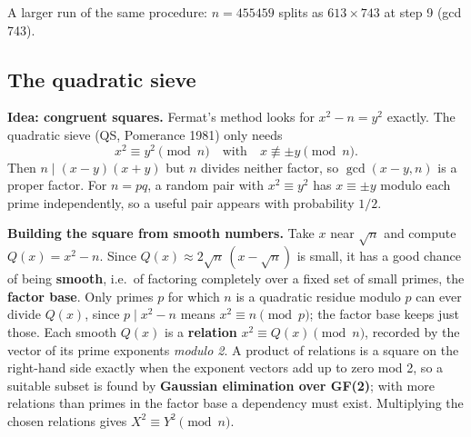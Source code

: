 \begin{center}
\end{center}
A larger run of the same procedure: $n = 455459$ splits as $613 \times 743$ at step 9 (gcd 743).

\subsection{The quadratic sieve \new}

\textbf{Idea: congruent squares.} Fermat's method looks for $x^2 - n = y^2$ exactly. The quadratic sieve (QS, Pomerance 1981) only needs
\[
x^2 \equiv y^2 \pmod n \quad\text{with}\quad x \not\equiv \pm y \pmod n .
\]
Then $n \mid (x - y)(x + y)$ but $n$ divides neither factor, so $\gcd(x - y, n)$ is a proper factor. For $n = pq$, a random pair with $x^2 \equiv y^2$ has $x \equiv \pm y$ modulo each prime independently, so a useful pair appears with probability $1/2$.

\textbf{Building the square from smooth numbers.} Take $x$ near $\sqrt n$ and compute $Q(x) = x^2 - n$. Since $Q(x) \approx 2\sqrt n\,(x - \sqrt n)$ is small, it has a good chance of being \textbf{smooth}, i.e.\ of factoring completely over a fixed set of small primes, the \textbf{factor base}. Only primes $p$ for which $n$ is a quadratic residue modulo $p$ can ever divide $Q(x)$, since $p \mid x^2 - n$ means $x^2 \equiv n \pmod p$; the factor base keeps just those. Each smooth $Q(x)$ is a \textbf{relation} $x^2 \equiv Q(x) \pmod n$, recorded by the vector of its prime exponents \emph{modulo 2}. A product of relations is a square on the right-hand side exactly when the exponent vectors add up to zero mod 2, so a suitable subset is found by \textbf{Gaussian elimination over GF(2)}; with more relations than primes in the factor base a dependency must exist. Multiplying the chosen relations gives $X^2 \equiv Y^2 \pmod n$.

